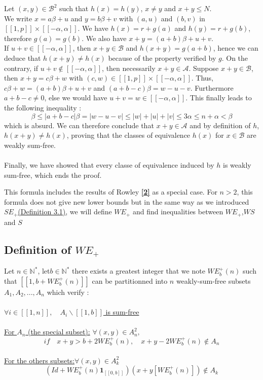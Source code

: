 Let $(x,y) \in \mathcal{B}^2$ such that $h(x) = h(y)$, $x \neq y$ and $x + y \leqslant N$.\\
We write $x = a\beta + u$ and $y = b\beta + v$ with $(a,u)$ and $(b,v)$ in $[\![1,p]\!] \times [\![-\alpha,\alpha]\!]$. We have $h(x) = r + g(a)$ and $h(y) = r + g(b)$, therefore $g(a) = g(b)$. We also have $x+y = (a+b)\beta + u +v$.\\
If $u + v \in [\![-\alpha,\alpha]\!]$, then $x+y \in \mathcal{B}$ and $h(x+y) = g(a+b)$, hence we can deduce that $h(x+y) \neq h(x)$ because of the property verified by $g$. On the contrary, if $u+v \notin [\![-\alpha,\alpha]\!]$, then necessarily $x+y \in \mathcal{A}$. Suppose $x+y \in \mathcal{B}$, then $x+y = c\beta + w$ with $(c,w) \in [\![1,p]\!] \times [\![-\alpha,\alpha]\!]$. Thus, $c\beta + w = (a+b)\beta + u + v$ and $(a+b-c)\beta = w-u-v$. Furthermore $a+b-c \neq 0$, else we would have $u+v = w \in [\![-\alpha,\alpha]\!]$. This finally leads to the following inequality :
\[\beta \leqslant |a+b-c|\beta = |w-u-v| \leqslant |w| + |u| + |v| \leqslant 3\alpha \leqslant n + \alpha < \beta
\]
which is absurd. We can therefore conclude that $x+y \in \mathcal{A}$ and by definition of $h$, $h(x+y) \neq h(x)$, proving that the classes of equivalence $h(x)$ for $x \in \mathcal{B}$ are weakly sum-free.\\
\\
Finally, we have showed that every classe of equivalence induced by $h$ is weakly sum-free, which ends the proof.

\begin{remark}
This formula includes the results of Rowley \hyperlink{label2}{\textbf{[2]}} as a special case. For \(n>2\), this formula does not give new lower bounds but in the same way as we introduced \(SE_+\)\hyperref[SE]{(Definition 3.1)}, we will define \(WE_+\) and find inequalities between \(WE_+\),\(WS\) and \(S\)
\end{remark}

\subsection{Definition of \(WE_+\)}

\begin{definition}
Let \( n \in \mathbb{N}^*\), let\( b \in \mathbb{N}^*\) there exists a greatest integer that we note \(WE_b^+(n)\) such that \( [\![1, b+WE_b^+(n)]\!]\) can be partitionned into \(n\) weakly-sum-free subsets \(A_1, A_2, ..., A_n\) which verify :
\\\\
\underline{\(\forall i \in [\![1, n]\!], \quad A_i\backslash [\![1, b]\!]\) is sum-free}
\\\\
\underline{For \(A_n\) (the special subset):} \quad \(\forall (x,y) \in A_n^2,\)
\\
\[if \quad x+y>b+2WE_b^+(n),\quad x+y-2WE_b^+(n)\notin A_n\]
\\
\underline{For the others subsets:}\quad \(\forall (x,y) \in A_k^2\)
\\
\[
(Id+WE_b^+(n)\mathbf{1}_{ [\![0,b]\!]})(x+y[WE_b^+(n)]) \notin A_k
\]

\end{definition}


